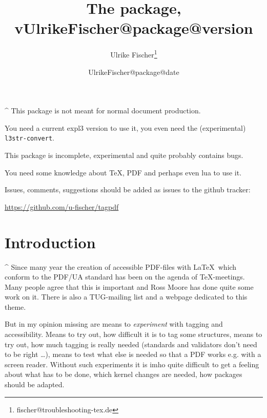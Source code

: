 \documentclass[DIV=12,parskip=half-,bibliography=totoc]{scrartcl}
\title{The \pkg{tagpdf} package, v\csname UlrikeFischer@package@version\endcsname}
\date{\csname UlrikeFischer@package@date\endcsname}
\author{Ulrike Fischer\thanks{fischer@troubleshooting-tex.de}}
\newcommand\PDF{PDF}
\begin{document}

 \maketitle
 \tagmcend
\tagstructend

\begin{tcolorbox}[colframe=red]
\TagP^ This package is not meant for normal document production.

\TagP You need a current expl3 version to use it, you even need the (experimental) \texttt{l3str-convert}.

\TagP This package is incomplete, experimental and quite probably contains bugs.

\TagP You need some knowledge about \TeX, \PDF{} and perhaps even lua to use it.

\medskip

\TagP Issues, comments, suggestions should be added as issues to the github tracker:\TagPend

\medskip
\centering \url{https://github.com/u-fischer/tagpdf}


\tagstructend
\end{tcolorbox}


\begin{NoHyper} %
\tableofcontents
\end{NoHyper}


\section{Introduction}


\TagP^ Since many year the creation of accessible \PDF{}-files with \LaTeX\ which conform to the PDF/UA standard has been on the agenda of \TeX-meetings. Many people agree that this is important and Ross Moore has done quite some work on it. There is also a TUG-mailing list and a webpage \parencite{tugaccess} dedicated to this theme.

\TagP But in my opinion missing are means to \emph{experiment} with tagging and accessibility. Means to try out, how difficult it is to tag some structures, means to try out, how much tagging is really needed (standards and validators don't need to be right \ldots), means to test what else is needed so that a \PDF{} works e.g. with a screen reader. Without such experiments it is imho quite difficult to get a feeling about what has to be done, which kernel changes are needed, how packages should be adapted.
\end{document}
